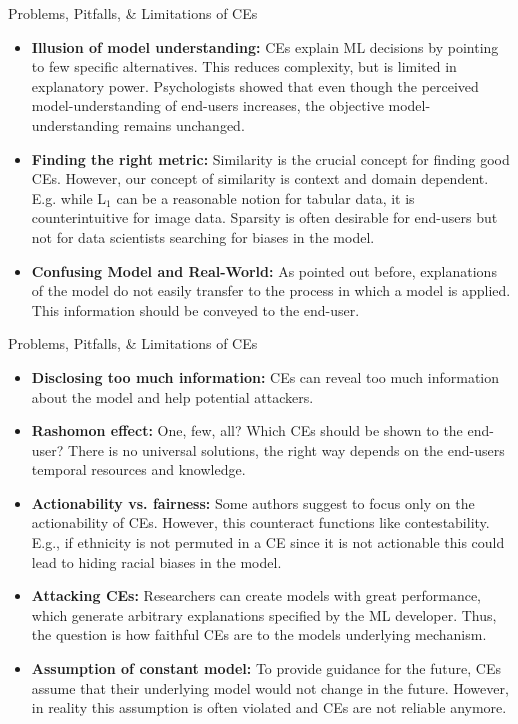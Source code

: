 \documentclass[aspectratio=169]{../latex_main/tntbeamer}  %
\begin{document}
\begin{frame}{Problems, Pitfalls, \& Limitations of CEs}
\begin{itemize}
    \item \textbf{Illusion of model understanding:} 
    CEs explain ML decisions by pointing to few specific alternatives. This reduces complexity, but is limited in explanatory power. Psychologists showed that even though the perceived model-understanding of end-users increases, the objective model-understanding remains unchanged.
    \pause
    \item \textbf{Finding the right metric:} Similarity is the crucial concept for finding good CEs. However, our concept of similarity is context and domain dependent. E.g. while L$_1$ can be a reasonable notion for tabular data, it is counterintuitive for image data. Sparsity is often desirable for end-users but not for data scientists searching for biases in the model.
    \pause
    \item \textbf{Confusing Model and Real-World:} As pointed out before, explanations of the model do not easily transfer to the process in which a model is applied. This information should be conveyed to the end-user.
\end{itemize}
    
\end{frame}
\begin{frame}{Problems, Pitfalls, \& Limitations of CEs}
\begin{itemize}
    \item \textbf{Disclosing too much information:} CEs can reveal too much information about the model and help potential attackers.
    \pause
    \item \textbf{Rashomon effect:} One, few, all? Which CEs should be shown to the end-user? There is no universal solutions, the right way depends on the end-users temporal resources and knowledge. 
    \pause
    \item \textbf{Actionability vs. fairness:} Some authors suggest to focus only on the actionability of CEs. However, this counteract functions like contestability. E.g., if ethnicity is not permuted in a CE since it is not actionable this could lead to hiding racial biases in the model.
    \pause
    \item \textbf{Attacking CEs:} Researchers can create models with great performance, which generate arbitrary explanations specified by the ML developer. Thus, the question is how faithful CEs are to the models underlying mechanism.
    \pause
    \item \textbf{Assumption of constant model:} To provide guidance for the future, CEs assume that their underlying model would not change in the future. However, in reality this assumption is often violated and CEs are not reliable anymore. 
\end{itemize}

\end{frame}
\end{document}
